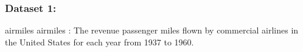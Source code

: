 \subsubsection{Dataset 1:}
 airmiles
airmiles : The revenue passenger miles flown by commercial airlines in the United States for each year from 1937 to 1960.